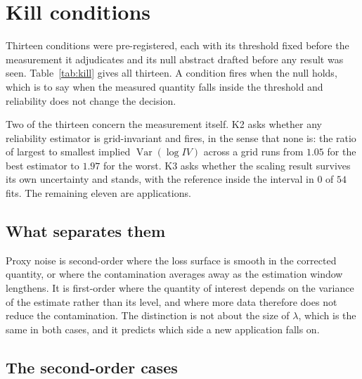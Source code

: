 \section{Kill conditions}\label{sec:conditions}

\nocite{corsi2009,bpq2016}

Thirteen conditions were pre-registered, each with its threshold fixed before the
measurement it adjudicates and its null abstract drafted before any result was
seen. Table~\ref{tab:kill} gives all thirteen. A condition fires when the null
holds, which is to say when the measured quantity falls inside the threshold and
reliability does not change the decision.

Two of the thirteen concern the measurement itself. K2 asks whether any
reliability estimator is grid-invariant and fires, in the sense that none is: the
ratio of largest to smallest implied $\operatorname{Var}(\log IV)$ across a grid
runs from $1.05$ for the best estimator to $1.97$ for the worst. K3 asks whether %
the scaling result survives its own uncertainty and stands, with the reference
inside the interval in $0$ of $54$ fits. The remaining eleven are applications. %



\subsection{What separates them}

Proxy noise is second-order where the loss surface is smooth in the corrected
quantity, or where the contamination averages away as the estimation window
lengthens. It is first-order where the quantity of interest depends on the
variance of the estimate rather than its level, and where more data therefore
does not reduce the contamination. The distinction is not about the size of
$\lambda$, which is the same in both cases, and it predicts which side a new
application falls on.

\subsection{The second-order cases}


